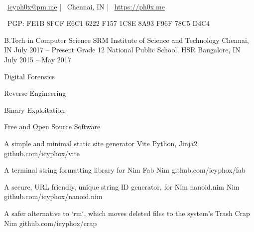 \documentclass[]{awesome-cv}
\begin{document}
    
\begin{center}
	  \\
	\vspace{2mm}
	{\faEnvelope\ \href{mailto:icyph0x@pm.me}{icyph0x@pm.me}} | {\faMapMarker\ Chennai, IN} | {\faLink\ \url{https://ph0x.me}}
	\begin{center}
		{\faKey\ PGP: FE1B 8FCF E6C1 6222 F157 1C8E 8A93 F96F 78C5 D4C4}
	\end{center} 
\end{center} 


\begin{cventries}
	\cventry
	{B.Tech in Computer Science}
	{SRM Institute of Science and Technology}
	{Chennai, IN}
	{July 2017 – Present}
	{}
	\cventry
	{Grade 12}
	{National Public School, HSR}
	{Bangalore, IN}
	{July 2015 – May 2017}
	{}
\end{cventries}


\vspace{-6mm}
\vspace{3mm}
	{\begin{cvitems}
		\item {Digital Forensics}
		\item {Reverse Engineering}
		\item {Binary Exploitation}
		\item {Free and Open Source Software}
	\end{cvitems}}

\begin{cventries}
	\cventry
	{A simple and minimal static site generator}
	{Vite}
	{Python, Jinja2}
	{github.com/icyphox/vite}
	{}
	
	\vspace{-5mm}
	\cventry
	{A terminal string formatting library for Nim}
	{Fab}
	{Nim}
	{github.com/icyphox/fab}
	{}

	\vspace{-5mm}
	\cventry
	{A secure, URL friendly, unique string ID generator, for Nim}
	{nanoid.nim}
	{Nim}
	{github.com/icyphox/nanoid.nim}
	{}

	\vspace{-5mm}
	\cventry
	{A safer alternative to `rm`, which moves deleted files to the system's Trash}  
	{Crap}
	{Nim}
	{github.com/icyphox/crap}
	{}
	
	\vspace{-5mm}

\end{cventries}
\end{document}
